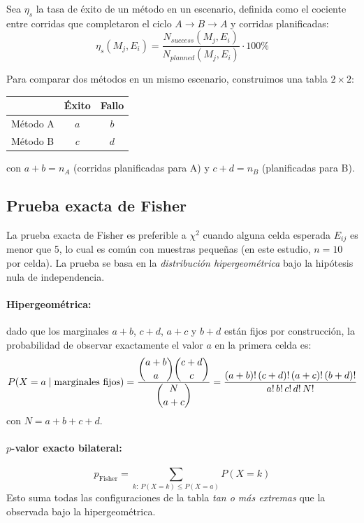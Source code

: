 \documentclass[12pt,a4paper,oneside]{book}
\begin{document}
Sea $\eta_s$ la tasa de éxito de un método en un escenario, definida como el cociente entre corridas que completaron el ciclo $A \to B \to A$ y corridas planificadas:
\begin{equation}
\eta_s(M_j, E_i) = \frac{N_{success}(M_j, E_i)}{N_{planned}(M_j, E_i)} \cdot 100\%
\end{equation}

Para comparar dos métodos en un mismo escenario, construimos una tabla $2\times 2$:

\begin{table}[H]
\centering
\begin{tabular}{lcc}
\toprule
& \textbf{Éxito} & \textbf{Fallo} \\
\midrule
Método A & $a$ & $b$ \\
Método B & $c$ & $d$ \\
\bottomrule
\end{tabular}
\end{table}

con $a+b = n_A$ (corridas planificadas para A) y $c+d = n_B$ (planificadas para B).

\subsection{Prueba exacta de Fisher}

La prueba exacta de Fisher es preferible a $\chi^2$ cuando alguna celda esperada $E_{ij}$ es menor que 5, lo cual es común con muestras pequeñas (en este estudio, $n=10$ por celda). La prueba se basa en la \emph{distribución hipergeométrica} bajo la hipótesis nula de independencia.

\paragraph{Hipergeométrica:} dado que los marginales $a+b$, $c+d$, $a+c$ y $b+d$ están fijos por construcción, la probabilidad de observar exactamente el valor $a$ en la primera celda es:
\begin{equation}
P(X = a \mid \text{marginales fijos}) = \frac{\dbinom{a+b}{a}\dbinom{c+d}{c}}{\dbinom{N}{a+c}}
= \frac{(a+b)!\,(c+d)!\,(a+c)!\,(b+d)!}{a!\,b!\,c!\,d!\,N!}
\end{equation}
con $N = a+b+c+d$.

\paragraph{$p$-valor exacto bilateral:}
\begin{equation}
p_{\text{Fisher}} = \sum_{k:\,P(X=k) \leq P(X=a)} P(X=k)
\end{equation}
Esto suma todas las configuraciones de la tabla \emph{tan o más extremas} que la observada bajo la hipergeométrica.
\end{document}
